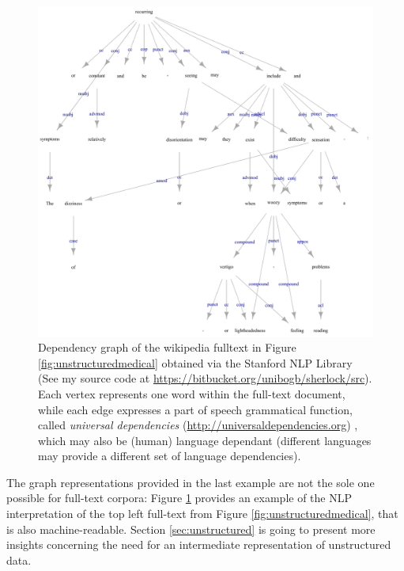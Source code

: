 \begin{figure}
\hspace*{-2cm}
  \includegraphics[width=1.3\textwidth]{fig/01dataint/recurringgrapj.pdf}
  \caption{Dependency graph of the wikipedia fulltext in Figure \ref{fig:unstructuredmedical} obtained via the Stanford NLP Library (See my source code at \url{https://bitbucket.org/unibogb/sherlock/src}). Each vertex represents one word within the full-text document, while each edge expresses a part of speech grammatical function, called \textit{universal dependencies} (\url{http://universaldependencies.org}) \cite{MarneffeDSHGNM14}, which may also be (human) language dependant (different languages may provide a different set of language dependencies).}
  \label{fig:dependencygraphexample}
\end{figure}

The graph representations provided in the last example are not the sole one possible for full-text corpora: Figure \ref{fig:dependencygraphexample} provides an example of the NLP interpretation of the top left full-text from Figure \ref{fig:unstructuredmedical}, that is also machine-readable. Section \vref{sec:unstructured} is going to present more insights concerning the need for an intermediate representation of unstructured data.



